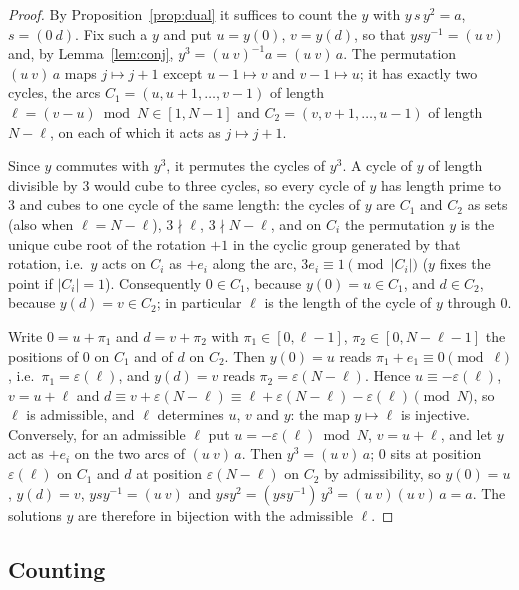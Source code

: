 \documentclass[preprint,12pt]{elsarticle}
\theoremstyle{definition}\newtheorem{defi}[thm]{Definition}\newtheorem{prob}[thm]{Problem}\newtheorem{obs}[thm]{Observation}
\theoremstyle{remark}\newtheorem{rem}[thm]{Remark}
\begin{document}
\begin{proof}
By Proposition~\ref{prop:dual} it suffices to count the $y$ with $y\,s\,y^{2}=a$, $s=(0\ d)$. Fix such a $y$ and put $u=y(0)$, $v=y(d)$,
so that $ysy^{-1}=(u\ v)$ and, by Lemma~\ref{lem:conj}, $y^{3}=(u\ v)^{-1}a=(u\ v)\,a$. The permutation $(u\ v)\,a$ maps $j\mapsto j+1$
except $u-1\mapsto v$ and $v-1\mapsto u$; it has exactly two cycles, the arcs $C_1=(u,u+1,\dots,v-1)$ of length $\ell=(v-u)\bmod N\in[1,N-1]$
and $C_2=(v,v+1,\dots,u-1)$ of length $N-\ell$, on each of which it acts as $j\mapsto j+1$.

Since $y$ commutes with $y^{3}$, it permutes the cycles of $y^{3}$. A cycle of $y$ of length divisible by $3$ would cube to three cycles,
so every cycle of $y$ has length prime to $3$ and cubes to one cycle of the same length: the cycles of $y$ are $C_1$ and $C_2$ as sets
(also when $\ell=N-\ell$), $3\nmid\ell$, $3\nmid N-\ell$, and on $C_i$ the permutation $y$ is the unique cube root of the rotation $+1$ in
the cyclic group generated by that rotation, i.e.\ $y$ acts on $C_i$ as $+e_i$ along the arc, $3e_i\equiv1\pmod{|C_i|}$ ($y$ fixes the
point if $|C_i|=1$). Consequently $0\in C_1$, because $y(0)=u\in C_1$, and $d\in C_2$, because $y(d)=v\in C_2$; in particular $\ell$ is the
length of the cycle of $y$ through $0$.

Write $0=u+\pi_1$ and $d=v+\pi_2$ with $\pi_1\in[0,\ell-1]$, $\pi_2\in[0,N-\ell-1]$ the positions of $0$ on $C_1$ and of $d$ on $C_2$.
Then $y(0)=u$ reads $\pi_1+e_1\equiv0\pmod\ell$, i.e.\ $\pi_1=\varepsilon(\ell)$, and $y(d)=v$ reads $\pi_2=\varepsilon(N-\ell)$. Hence
$u\equiv-\varepsilon(\ell)$, $v=u+\ell$ and $d\equiv v+\varepsilon(N-\ell)\equiv\ell+\varepsilon(N-\ell)-\varepsilon(\ell)\pmod N$, so $\ell$
is admissible, and $\ell$ determines $u$, $v$ and $y$: the map $y\mapsto\ell$ is injective. Conversely, for an admissible $\ell$ put
$u=-\varepsilon(\ell)\bmod N$, $v=u+\ell$, and let $y$ act as $+e_i$ on the two arcs of $(u\ v)\,a$. Then $y^{3}=(u\ v)\,a$; $0$ sits at
position $\varepsilon(\ell)$ on $C_1$ and $d$ at position $\varepsilon(N-\ell)$ on $C_2$ by admissibility, so $y(0)=u$, $y(d)=v$,
$ysy^{-1}=(u\ v)$ and $ysy^{2}=(ysy^{-1})\,y^{3}=(u\ v)(u\ v)\,a=a$. The solutions $y$ are therefore in bijection with the admissible $\ell$.
\end{proof}

\subsection{Counting}\label{sec:stat}
\end{document}
